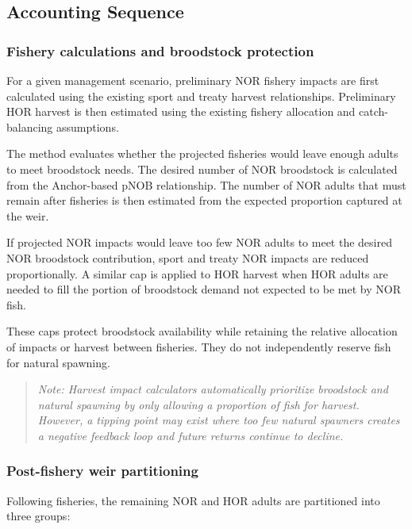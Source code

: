 \documentclass[12pt,letterpaper]{article}
\begin{document}
\subsection{Accounting Sequence}\label{accounting-sequence}

\subsubsection{Fishery calculations and broodstock protection}\label{fishery-calculations-and-broodstock-protection}

For a given management scenario, preliminary NOR fishery impacts are first calculated using the existing sport and treaty harvest relationships. Preliminary HOR harvest is then estimated using the existing fishery allocation and catch-balancing assumptions.

The method evaluates whether the projected fisheries would leave enough adults to meet broodstock needs. The desired number of NOR broodstock is calculated from the Anchor-based pNOB relationship. The number of NOR adults that must remain after fisheries is then estimated from the expected proportion captured at the weir.

If projected NOR impacts would leave too few NOR adults to meet the desired NOR broodstock contribution, sport and treaty NOR impacts are reduced proportionally. A similar cap is applied to HOR harvest when HOR adults are needed to fill the portion of broodstock demand not expected to be met by NOR fish.

These caps protect broodstock availability while retaining the relative allocation of impacts or harvest between fisheries. They do not independently reserve fish for natural spawning.

\begin{quote}
\emph{Note: Harvest impact calculators automatically prioritize broodstock and natural spawning by only allowing a proportion of fish for harvest. However, a tipping point may exist where too few natural spawners creates a negative feedback loop and future returns continue to decline.}
\end{quote}

\subsubsection{Post-fishery weir partitioning}\label{post-fishery-weir-partitioning}

Following fisheries, the remaining NOR and HOR adults are partitioned into three groups:
\end{document}
